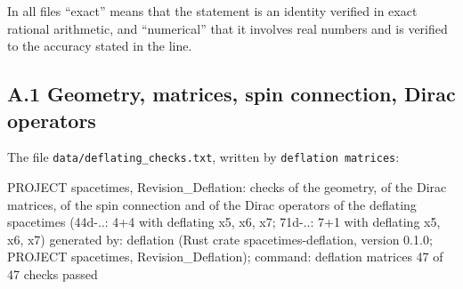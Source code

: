 \documentclass[
  10pt,
]{article}
\newenvironment{Shaded}{}{}
\newcommand{\NormalTok}[1]{#1}
\begin{document}
In all files ``exact'' means that the statement is an identity verified
in exact rational arithmetic, and ``numerical'' that it involves real
numbers and is verified to the accuracy stated in the line.

\hypertarget{a.1-geometry-matrices-spin-connection-dirac-operators}{%
\subsection{A.1 Geometry, matrices, spin connection, Dirac
operators}\label{a.1-geometry-matrices-spin-connection-dirac-operators}}

The file \texttt{data/deflating\_checks.txt}, written by
\texttt{deflation\ matrices}:

\begin{Shaded}
\begin{Highlighting}[]
\NormalTok{PROJECT spacetimes, Revision\_Deflation: checks of the geometry, of the Dirac matrices, of the spin connection and of the Dirac operators of the deflating spacetimes (44d{-}..: 4+4 with deflating x5, x6, x7; 71d{-}..: 7+1 with deflating x5, x6, x7)}
\NormalTok{generated by: deflation (Rust crate spacetimes{-}deflation, version 0.1.0; PROJECT spacetimes, Revision\_Deflation); command: deflation matrices}
\NormalTok{47 of 47 checks passed}


\end{Highlighting}
\end{Shaded}
\end{document}
